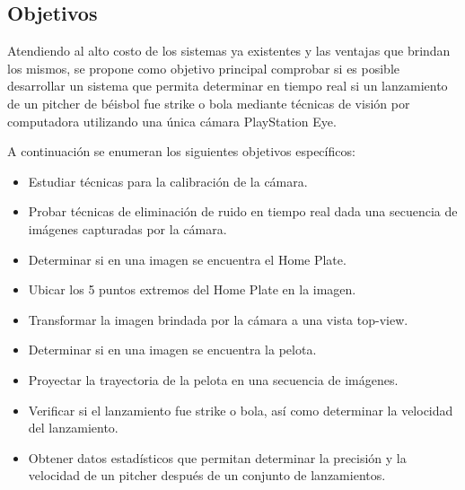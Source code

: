 \subsection*{Objetivos}

Atendiendo al alto costo de los sistemas ya existentes y las ventajas que brindan los mismos, se propone como objetivo principal comprobar si es posible desarrollar un sistema que permita determinar en tiempo real si un lanzamiento de un pitcher de béisbol fue strike o bola mediante técnicas de visión por computadora utilizando una única cámara PlayStation Eye.

A continuación se enumeran los siguientes objetivos específicos:
\begin{itemize}
    \item {Estudiar técnicas para la calibración de la cámara.}
    \item {Probar técnicas de eliminación de ruido en tiempo real dada una secuencia de imágenes capturadas por la cámara.}
    \item {Determinar si en una imagen se encuentra el Home Plate.}
    \item {Ubicar los 5 puntos extremos del Home Plate en la imagen.}
    \item {Transformar la imagen brindada por la cámara a una vista top-view.}
    \item {Determinar si en una imagen se encuentra la pelota.}
    \item {Proyectar la trayectoria de la pelota en una secuencia de imágenes.}
    \item {Verificar si el lanzamiento fue strike o bola, así como determinar la velocidad del lanzamiento.}
    \item {Obtener datos estadísticos que permitan determinar la precisión y la velocidad de un pitcher después de un conjunto de lanzamientos.}
\end{itemize}



